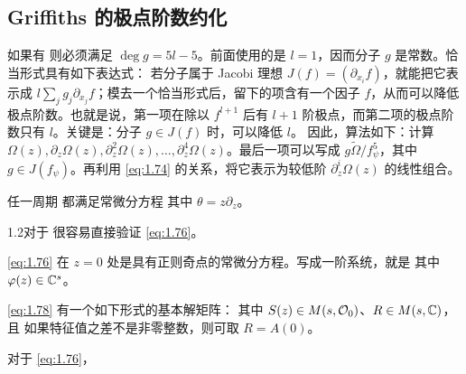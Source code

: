 \subsection{Griffiths 的极点阶数约化}
如果有
则必须满足 $\deg g=5l-5$。前面使用的是 $l=1$，因而分子 $g$ 是常数。恰当形式具有如下表达式：
若分子属于 Jacobi 理想 $J(f)=(\partial_{x_i}f)$，就能把它表示成 $l\sum_jg_j\partial_{x_j}f$；模去一个恰当形式后，留下的项含有一个因子 $f$，从而可以降低极点阶数。也就是说，第一项在除以 $f^{l+1}$ 后有 $l+1$ 阶极点，而第二项的极点阶数只有 $l$。关键是：分子 $g\in J(f)$ 时，可以降低 $l$。
因此，算法如下：计算 $\Omega(z),\partial_z\Omega(z),\partial_z^2\Omega(z),\ldots,\partial_z^4\Omega(z)$。最后一项可以写成 $g\widetilde\Omega/f_\psi^5$，其中 $g\in J(f_\psi)$。再利用 \eqref{eq:1.74} 的关系，将它表示为较低阶 $\partial_z^i\Omega(z)$ 的线性组合。
\begin{proposition}\label{pro:1.4}
任一周期
都满足常微分方程
其中 $\theta=z\partial_z$。
\end{proposition}
\begin{Note}{1.2}对于
很容易直接验证 \eqref{eq:1.76}。
\end{Note}
\eqref{eq:1.76} 在 $z=0$ 处是具有正则奇点的常微分方程。写成一阶系统，就是
其中 $\varphi(z)\in\mathbb C^s$。
\begin{theorem}\label{thm:1.5}
\eqref{eq:1.78} 有一个如下形式的基本解矩阵：
其中 $S(z)\in M(s,\mathcal O_0)$、$R\in M(s,\mathbb C)$，且
如果特征值之差不是非零整数，则可取 $R=A(0)$。
\end{theorem}
对于 \eqref{eq:1.76}，
